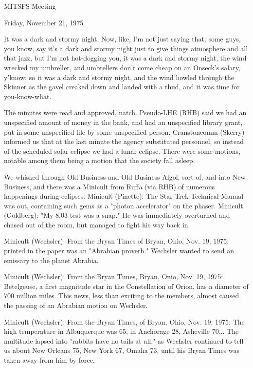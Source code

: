 \documentclass[12pt]{article}
\begin{document}
\begin{center}

MITSFS Meeting

Friday, November 21, 1975

\end{center}
 
\vspace{12pt}

\setlength{\parskip}{6pt}

\noindent
It was a dark and stormy night. Now, like, I'm not just saying that; some guys, you know, say it's a dark and stormy night just to give things atmosphere and all that jazz, but I'm not hot-dogging you, it was a dark and stormy night, the wind wrecked my umbreller, and umbrellers don't come cheap on an Onseck's salary, y'know; so it was a dark and stormy night, and the wind howled through the Skinner as the gavel creaked down and landed with a thud, and it was time for you-know-what.

The minutes were read and approved, natch. Pseudo-LHE (RHB) said we had an unspecified amount of money in the bank, and had an unspecified library grant, put in some unspecified file by some unspecified person. Cranstoncomm (Skerry) informed us that at the last minute the agency substituted personnel, so instead of the scheduled solar eclipse we had a lunar eclipse. There were some motions, notable among them being a motion that the society fall asleep.

We whisked through Old Business and Old Business Algol, sort of, and into New Business, and there was a Minicult from Ruffa (via RHB) of numerous happenings during eclipses. Minicult (Pinette): The Star Trek Technical Manual was out, containing such gems as a "photon accelerator" on the phaser. Minicult (Goldberg): "My 8.03 test was a snap." He was immediately overturned and chased out of the room, but managed to fight his way back in.

Minicult (Wechsler): From the Bryan Times of Bryan, Ohio, Nov. 19, 1975: printed in the paper was an "Abrabian proverb." Wechsler wanted to send an emissary to the planet Abrabia.

Minicult (Wechsler): From the Bryan Times, Bryan, Onio, Nov. 19, 1975: Betelgeuse, a first magnitude star in the Constellation of Orion, has a diameter of 700 million miles. This news, less than exciting to the members, almost caused the passing of an Abrabian motion on Wechsler.

Minicult (Wechsler): From the Bryan Times, of Bryan, Ohio, Nov. 19, 1975: The high temperature in Albuquerque was 65, in Anchorage 28, Asheville 70... The multitude lapsed into "rabbits have no tails at all," as Wechsler continued to tell us about New Orleans 75, New York 67, Omaha 73, until his Bryan Times was taken away from him by force.
\end{document}
